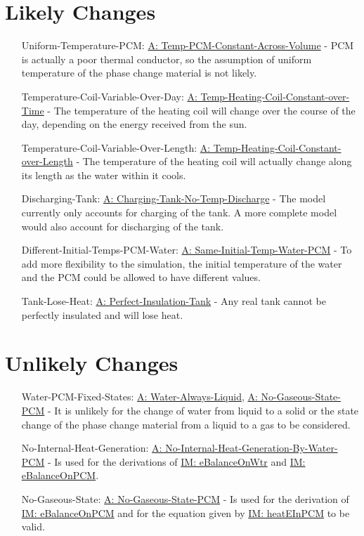 \documentclass[12pt]{article}
\begin{document}
\section{Likely Changes}
\label{Sec:LCs}
\begin{itemize}
\item[Uniform-Temperature-PCM:\phantomsection\label{likeChgUTP}]\hyperref[assumpTPCAV]{A: Temp-PCM-Constant-Across-Volume} - PCM is actually a poor thermal conductor, so the assumption of uniform temperature of the phase change material is not likely.
\item[Temperature-Coil-Variable-Over-Day:\phantomsection\label{likeChgTCVOD}]\hyperref[assumpTHCCoT]{A: Temp-Heating-Coil-Constant-over-Time} - The temperature of the heating coil will change over the course of the day, depending on the energy received from the sun.
\item[Temperature-Coil-Variable-Over-Length:\phantomsection\label{likeChgTCVOL}]\hyperref[assumpTHCCoL]{A: Temp-Heating-Coil-Constant-over-Length} - The temperature of the heating coil will actually change along its length as the water within it cools.
\item[Discharging-Tank:\phantomsection\label{likeChgDT}]\hyperref[assumpCTNOD]{A: Charging-Tank-No-Temp-Discharge} - The model currently only accounts for charging of the tank. A more complete model would also account for discharging of the tank.
\item[Different-Initial-Temps-PCM-Water:\phantomsection\label{likeChgDITPW}]\hyperref[assumpSITWP]{A: Same-Initial-Temp-Water-PCM} - To add more flexibility to the simulation, the initial temperature of the water and the PCM could be allowed to have different values.
\item[Tank-Lose-Heat:\phantomsection\label{likeChgTLH}]\hyperref[assumpPIT]{A: Perfect-Insulation-Tank} - Any real tank cannot be perfectly insulated and will lose heat.
\end{itemize}
\section{Unlikely Changes}
\label{Sec:UCs}
\begin{itemize}
\item[Water-PCM-Fixed-States:\phantomsection\label{unlikeChgWPFS}]\hyperref[assumpWAL]{A: Water-Always-Liquid}, \hyperref[assumpNGSP]{A: No-Gaseous-State-PCM} - It is unlikely for the change of water from liquid to a solid or the state change of the phase change material from a liquid to a gas to be considered.
\item[No-Internal-Heat-Generation:\phantomsection\label{unlikeChgNIHG}]\hyperref[assumpNIHGBWP]{A: No-Internal-Heat-Generation-By-Water-PCM} - Is used for the derivations of \hyperref[IM:eBalanceOnWtr]{IM: eBalanceOnWtr} and \hyperref[IM:eBalanceOnPCM]{IM: eBalanceOnPCM}.
\item[No-Gaseous-State:\phantomsection\label{unlikeChgNGS}]\hyperref[assumpNGSP]{A: No-Gaseous-State-PCM} - Is used for the derivation of \hyperref[IM:eBalanceOnPCM]{IM: eBalanceOnPCM} and for the equation given by \hyperref[IM:heatEInPCM]{IM: heatEInPCM} to be valid.
\end{itemize}
\end{document}
